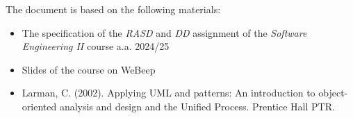 The document is based on the following materials:

\begin{itemize}
    \item The specification of the \textit{RASD} and \textit{DD} assignment of the
    \textit{Software Engineering II} course a.a. 2024/25
    \item Slides of the course on WeBeep
    \item  Larman, C. (2002). Applying UML and patterns: An introduction to
object-oriented analysis and design and the Unified Process. Prentice
Hall PTR.
\end{itemize}



